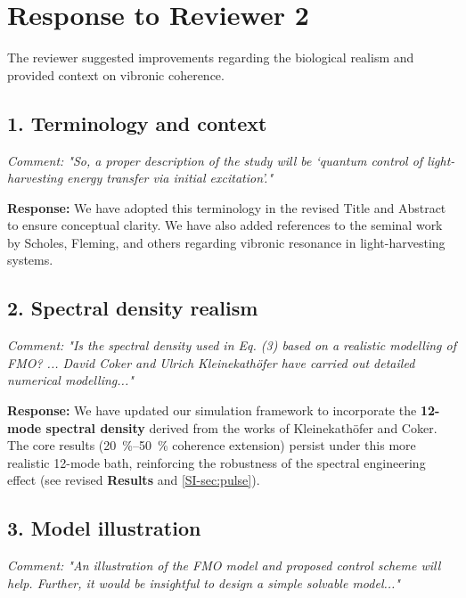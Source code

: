\documentclass[11pt]{article}
\begin{document}
\vspace{2em}

\section*{Response to Reviewer 2}

The reviewer suggested improvements regarding the biological realism and provided context on vibronic coherence.

\subsection*{1. Terminology and context}

\textit{Comment: "So, a proper description of the study will be ‘quantum control of light-harvesting energy transfer via initial excitation’."}

\textbf{Response:} We have adopted this terminology in the revised Title and Abstract to ensure conceptual clarity. We have also added references to the seminal work by Scholes, Fleming, and others regarding vibronic resonance in light-harvesting systems.

\subsection*{2. Spectral density realism}

\textit{Comment: "Is the spectral density used in Eq. (3) based on a realistic modelling of FMO? ... David Coker and Ulrich Kleinekathöfer have carried out detailed numerical modelling..."}

\textbf{Response:} We have updated our simulation framework to incorporate the \textbf{12-mode spectral density} derived from the works of Kleinekathöfer and Coker. The core results (\SIrange{20}{50}{\percent} coherence extension) persist under this more realistic 12-mode bath, reinforcing the robustness of the spectral engineering effect (see revised \textbf{Results} and \cref{SI-sec:pulse}).

\subsection*{3. Model illustration}

\textit{Comment: "An illustration of the FMO model and proposed control scheme will help. Further, it would be insightful to design a simple solvable model..."}
\end{document}
